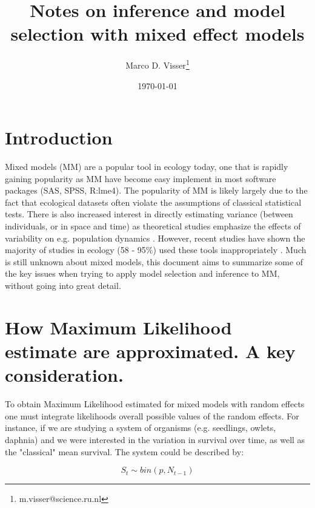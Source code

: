 \documentclass{article}\usepackage[]{graphicx}\usepackage[]{color}
\numberwithin{equation}{section} %
\numberwithin{figure}{section} %
\numberwithin{table}{section} %
\begin{document}

\title{Notes on inference and model selection with mixed effect models}
\date{\today}
\author[1,2]{Marco D. Visser\thanks{m.visser@science.ru.nl}}


\maketitle

\tableofcontents

\section{Introduction}

Mixed models (MM) are a popular tool in ecology today, one that is rapidly gaining popularity as MM have become easy implement in most software packages (SAS, SPSS, R:lme4). The popularity of MM is likely largely due to the fact that ecological datasets often violate the assumptions of classical statistical tests. There is also increased interest in directly estimating variance (between individuals, or in space and time) as theoretical studies emphasize the effects of variability on e.g. population dynamics \citep{Pfister2003}. However, recent studies have shown the majority of studies in ecology (58 - 95\%) used these tools inappropriately \citep{Bolker2009}. Much is still unknown about mixed models, this document aims to summarize some of the key issues when trying to apply model selection and inference to MM, without going into great detail.

\section{How Maximum Likelihood estimate are approximated. A key consideration.}

To obtain Maximum Likelihood estimated for mixed models with random effects one must integrate likelihoods overall possible values of the random effects. For instance, if we are studying a system of organisms (e.g. seedlings, owlets, daphnia) and we were interested in the variation in survival over time, as well as the "classical" mean survival. The system could be described by: 

\begin{equation}
S_t \sim bin(p,N_{t-1}) 
\end{equation}
\end{document}
